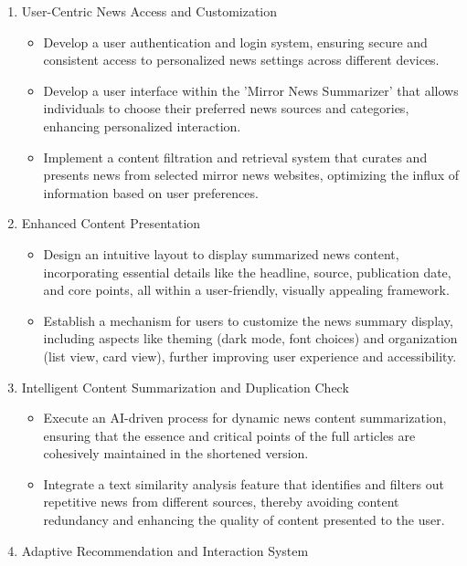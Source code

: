 \documentclass[a4paper]{article}
\begin{document}
\begin{enumerate}
    \item User-Centric News Access and Customization
        \begin{itemize}
            \item Develop a user authentication and login system, ensuring secure and consistent access to personalized news settings across different devices.
            \item Develop a user interface within the 'Mirror News Summarizer' that allows individuals to choose their preferred news sources and categories, enhancing personalized interaction.
            \item Implement a content filtration and retrieval system that curates and presents news from selected mirror news websites, optimizing the influx of information based on user preferences.
        \end{itemize}
    \item Enhanced Content Presentation
        \begin{itemize}
            \item Design an intuitive layout to display summarized news content, incorporating essential details like the headline, source, publication date, and core points, all within a user-friendly, visually appealing framework.
            \item Establish a mechanism for users to customize the news summary display, including aspects like theming (dark mode, font choices) and organization (list view, card view), further improving user experience and accessibility.
        \end{itemize}
    \item Intelligent Content Summarization and Duplication Check
        \begin{itemize}
            \item Execute an AI-driven process for dynamic news content summarization, ensuring that the essence and critical points of the full articles are cohesively maintained in the shortened version.
            \item Integrate a text similarity analysis feature that identifies and filters out repetitive news from different sources, thereby avoiding content redundancy and enhancing the quality of content presented to the user.
        \end{itemize}
    \item Adaptive Recommendation and Interaction System
        \begin{itemize}

\end{itemize}
\end{enumerate}
\end{document}
